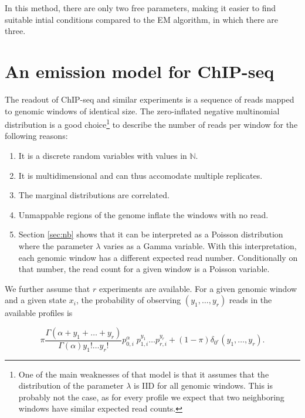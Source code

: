 \documentclass[12pt]{article}
\begin{document}
\begin{appendices}
    In this method, there are only two free parameters, making
    it easier to find suitable intial conditions compared to
    the EM algorithm, in which there are three.


\section{An emission model for ChIP-seq}

    The readout of ChIP-seq and similar experiments is a sequence of
    reads mapped to genomic windows of identical size.
    The zero-inflated negative multinomial distribution is a good
    choice\footnote{One
    of the main weaknesses of that model is that it
    assumes that the distribution of the parameter $\lambda$ is IID
    for all genomic windows. This is probably not the case, as for
    every profile we expect that two neighboring windows have similar
    expected read counts.} to describe
    the number of reads per window for the following reasons:

    \begin{enumerate}
      \item It is a discrete random variables with values in
        $\mathbb{N}$.
      \item It is multidimensional and can thus accomodate multiple
        replicates.
      \item The marginal distributions are correlated.
      \item Unmappable regions of the genome inflate the windows
        with no read.
      \item Section \ref{sec:nb} shows that it can be interpreted
        as a Poisson distribution where the parameter $\lambda$
        varies as a Gamma variable. With this interpretation, each
        genomic window has a different expected read number.
        Conditionally on that number, the read count for a given
        window is a Poisson variable.
    \end{enumerate}

    We further assume that $r$ experiments are available.
    For a given genomic window and a given state $x_i$, the
    probability of observing $(y_1, \ldots, y_r)$ reads in the
    available profiles is

    \begin{equation*}
      \pi \frac{\Gamma(\alpha+y_1+\ldots+y_r)}
      {\Gamma(\alpha)y_1! \ldots y_r!}
      p_{0,i}^{\alpha} \; p_{1,i}^{y_1} \ldots p_{r,i}^{y_r}
      + (1-\pi) \delta_{0^r}(y_1, \ldots, y_r).
    \end{equation*}


\end{appendices}
\end{document}
